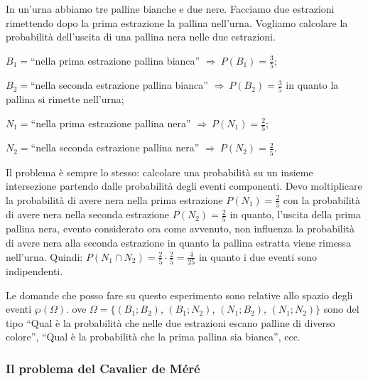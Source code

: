 \begin{exrig}
\begin{esempio}
In un'urna abbiamo tre palline bianche e due nere. Facciamo due estrazioni rimettendo dopo la prima estrazione la pallina nell'urna. Vogliamo calcolare la probabilità dell'uscita di una pallina nera nelle due estrazioni.
\begin{itemize*}
\item $B_{1}=$``nella prima estrazione pallina bianca'' $\Rightarrow\: P(B_1)=\frac 3 5$;
\item $B_{2}=$``nella seconda estrazione pallina bianca'' $\Rightarrow\: P(B_2)=\frac 3 5$ in quanto la pallina si rimette nell'urna;
\item $N_{1}=$``nella prima estrazione pallina nera'' $\Rightarrow\: P(N_1)=\frac 2 5$;
\item $N_{2}=$``nella seconda estrazione pallina nera'' $\Rightarrow\: P(N_2)=\frac 2 5$.
\end{itemize*}
Il problema è sempre lo stesso: calcolare una probabilità su un insieme intersezione partendo dalle probabilità degli eventi componenti. Devo moltiplicare la probabilità di avere nera nella prima estrazione $P(N_1)=\frac 2 5$ con la probabilità di avere nera nella seconda estrazione $P(N_2)=\frac 2 5$ in quanto, l'uscita della prima pallina nera, evento considerato ora come avvenuto, non influenza la probabilità di avere nera alla seconda estrazione in quanto la pallina estratta viene rimessa nell'urna. Quindi: $P(N_1\cap N_2)=\frac 2 5\cdot \frac 2 5=\frac 4{25}$ in quanto i due eventi sono indipendenti.
\begin{center}
 
\end{center}

Le domande che posso fare su questo esperimento sono relative allo spazio degli eventi $\wp(\Omega).$ ove $\Omega =\{(B_1;B_2)$, $(B_1;N_2)$, $(N_1;B_2)$, $(N_1;N_2)\}$ sono del tipo ``Qual è la probabilità che nelle due estrazioni escano palline di diverso colore'', ``Qual è la probabilità che la prima pallina sia bianca'', ecc.
\end{esempio}
\end{exrig}

\subsubsection*{Il problema del Cavalier de Méré}

